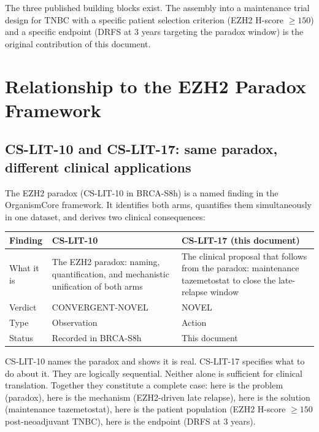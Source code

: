 \documentclass[12pt, a4paper]{article}
\begin{document}
The three published building blocks exist. The
assembly into a maintenance trial design for TNBC
with a specific patient selection criterion
(EZH2 H-score $\geq150$) and a specific endpoint
(DRFS at 3 years targeting the paradox window)
is the original contribution of this document.

\section{Relationship to the EZH2 Paradox Framework}

\subsection{CS-LIT-10 and CS-LIT-17: same paradox,
different clinical applications}

The EZH2 paradox (CS-LIT-10 in BRCA-S8h) is a
named finding in the OrganismCore framework. It
identifies both arms, quantifies them simultaneously
in one dataset, and derives two clinical consequences:

\begin{center}
\begin{tabular}{p{3cm}p{5cm}p{5cm}}
\toprule
\textbf{Finding} & \textbf{CS-LIT-10}
& \textbf{CS-LIT-17 (this document)} \\
\midrule
What it is
& The EZH2 paradox: naming,
  quantification, and
  mechanistic unification
  of both arms
& The clinical proposal that
  follows from the paradox:
  maintenance tazemetostat
  to close the late-relapse
  window \\[0.3em]
Verdict
& CONVERGENT-NOVEL
& NOVEL \\[0.3em]
Type
& Observation
& Action \\[0.3em]
Status
& Recorded in BRCA-S8h
& This document \\
\bottomrule
\end{tabular}
\end{center}

CS-LIT-10 names the paradox and shows it is real.
CS-LIT-17 specifies what to do about it. They are
logically sequential. Neither alone is sufficient
for clinical translation. Together they constitute
a complete case: here is the problem (paradox),
here is the mechanism (EZH2-driven late relapse),
here is the solution (maintenance tazemetostat),
here is the patient population (EZH2 H-score
$\geq150$ post-neoadjuvant TNBC), here is the
endpoint (DRFS at 3 years).
\end{document}

